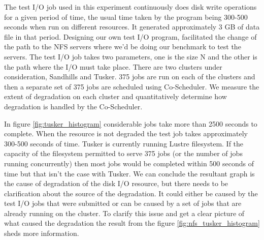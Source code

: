 \documentclass[ms,electronic,double]{nuthesis}
\begin{document}
The test I/O job used in this experiment continuously does disk write operations for a given period of time, the 
usual time taken by the program being 300-500 seconds when run on different resources. It generated approximately 3 GB of data file
in that period. Designing our own test I/O program,  facilitated the change of the path
to the NFS servers where we'd be doing our benchmark to test the servers. The test I/O job takes two 
parameters, 
one is the size N and the other is the path where the I/O must take place. There are two 
clusters under consideration, Sandhills and Tusker. 375 jobs are run on each of 
the clusters and then a separate set of 375 jobs are scheduled using 
Co-Scheduler. We measure the extent of degradation on each cluster and quantitatively 
determine how degradation is handled by the Co-Scheduler.

In figure \ref{fig:tusker_histogram}  considerable jobs take more than 2500 seconds to complete. 
When the resource is not degraded the test job takes approximately 300-500 seconds of time. Tusker is 
currently running Lustre filesystem. If the capacity of the filesystem permitted 
to serve 375 jobs (or the number of jobs running concurrently) then most jobs 
would be completed within 500 seconds of time but that isn't the case with Tusker. We can conclude the resultant graph is the cause of degradation 
of the disk I/O resource, but there needs to be clarification about the source of the degradation. 
It could either be caused by the test I/O jobs that were submitted or can be caused 
by a set of jobs that are already running on the cluster. To clarify this issue 
and get a clear picture of what caused the degradation the result from the 
figure \ref{fig:nfs_tusker_histogram} sheds more information.
\end{document}
